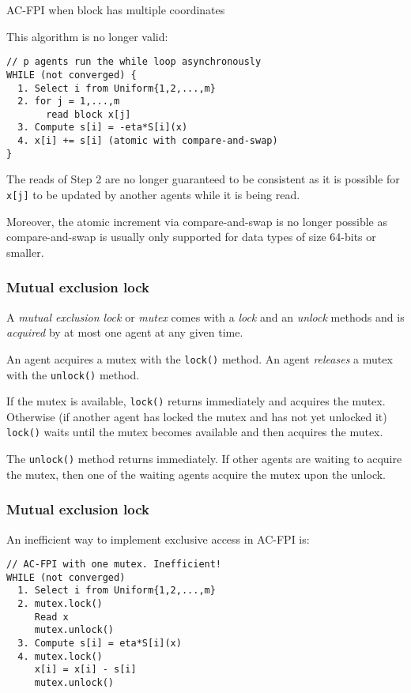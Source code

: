 \documentclass[10pt,mathserif]{beamer}
\begin{document}
\begin{frame}[fragile]{AC-FPI when block has multiple coordinates}

This algorithm is no longer valid:
\begin{lstlisting}
// p agents run the while loop asynchronously
WHILE (not converged) {
  1. Select i from Uniform{1,2,...,m}
  2. for j = 1,...,m
       read block x[j]
  3. Compute s[i] = -eta*S[i](x)
  4. x[i] += s[i] (atomic with compare-and-swap)
}
\end{lstlisting}
\medskip

The reads of Step 2 are no longer guaranteed to be consistent as it is possible for \verb|x[j]| to be updated by another agents while it is being read.
\medskip

Moreover, the atomic increment via compare-and-swap is no longer possible as compare-and-swap is usually only supported for data types of size 64-bits or smaller.
\end{frame}



\begin{frame}[fragile]
\frametitle{Mutual exclusion lock}
A \emph{mutual exclusion lock} or \emph{mutex} comes with a \emph{lock} and an \emph{unlock} methods and
is \emph{acquired} by at most one agent at any given time. 
\medskip

An agent acquires a mutex with the \verb|lock()| method. An agent \emph{releases} a mutex with the \verb|unlock()| method.
\medskip

If the mutex is available, \verb|lock()| returns immediately and acquires the mutex.
Otherwise (if another agent has locked the mutex and has not yet unlocked it) \verb|lock()| waits until the mutex becomes available and then acquires the mutex.
\medskip

The \verb|unlock()| method returns immediately. If other agents are waiting to acquire the mutex, then one of the waiting agents acquire the mutex upon the unlock.

\end{frame}



\begin{frame}[fragile]
\frametitle{Mutual exclusion lock}
An inefficient way to implement exclusive access in AC-FPI is:
\begin{lstlisting}
// AC-FPI with one mutex. Inefficient!
WHILE (not converged)
  1. Select i from Uniform{1,2,...,m}
  2. mutex.lock()
     Read x
     mutex.unlock()
  3. Compute s[i] = eta*S[i](x)
  4. mutex.lock()
     x[i] = x[i] - s[i]
     mutex.unlock()
\end{lstlisting}
\end{frame}
\end{document}
